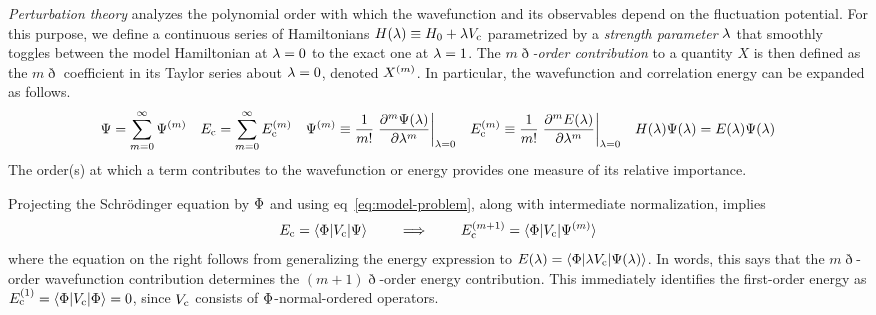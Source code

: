 \documentclass[11pt]{article}
\numberwithin{equation}{section}
\begin{document}
\begin{dfn}
\textit{Perturbation theory} analyzes the polynomial order with which the wavefunction and its observables depend on the fluctuation potential.
For this purpose, we define a continuous series of Hamiltonians
$
  H(\lambda )
\equiv
  H_0
+
  \lambda 
  V_{\mathrm{c}}
$
parametrized by a \textit{strength parameter} $\lambda $ that smoothly toggles between the model Hamiltonian at $\lambda =0$ to the exact one at $\lambda =1$.
The \textit{$m\eth$-order contribution} to a quantity $X$ is then defined as the $m\eth$ coefficient in its Taylor series about $\lambda =0$, denoted $X^{(m)}$.
In particular, the wavefunction and correlation energy can be expanded as follows.
\begin{align}
\label{eq:series-schrodinger-equation}
  \Psi 
=
  \sum_{m=0}^\infty
  \Psi ^{(m)}
&&
  E_{\mathrm{c}}
=
  \sum_{m=0}^\infty
  E_{\mathrm{c}}^{(m)}
&&
  \Psi ^{(m)}
\equiv
  \frac {1}{m!}
  \left.
    \frac {\partial^m\Psi (\lambda )}{\partial\lambda ^m}
  \right|_{\lambda =0}
&&
  E_{\mathrm{c}}^{(m)}
\equiv
  \frac {1}{m!}
  \left.
    \frac {\partial^mE(\lambda )}{\partial\lambda ^m}
  \right|_{\lambda =0}
&&
  H(\lambda )
  \Psi (\lambda )
=
  E(\lambda )
  \Psi (\lambda )
\end{align}
The order(s) at which a term contributes to the wavefunction or energy provides one measure of its relative importance.
\end{dfn}

\begin{rmk}
Projecting the Schr\"odinger equation by $\Phi $ and using eq~\ref{eq:model-problem}, along with intermediate normalization, implies
\begin{align}
  E_{\mathrm{c}}
=
  \langle\Phi |V_{\mathrm{c}}|\Psi \rangle
\hspace{20pt}
\implies
\hspace{20pt}
  E_{\mathrm{c}}^{(m+1)}
=
  \langle\Phi |V_{\mathrm{c}}|\Psi ^{(m)}\rangle
\end{align}
where the equation on the right follows from generalizing the energy expression to
$
  E(\lambda )
=
  \langle\Phi |\lambda  V_{\mathrm{c}}|\Psi (\lambda )\rangle
$.
In words, this says that the $m\eth$-order wavefunction contribution determines the $(m+1)\eth$-order energy contribution.
This immediately identifies the first-order energy as
$
  E_{\mathrm{c}}^{(1)}
=
  \langle\Phi |V_{\mathrm{c}}|\Phi \rangle
=
  0
$,
since $V_{\mathrm{c}}$ consists of $\Phi $-normal-ordered operators.
\end{rmk}
\end{document}
